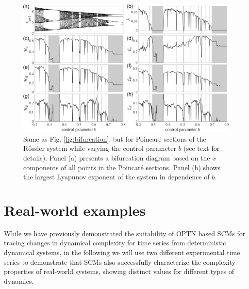 \documentclass[12pt,aip,cha,reprint,nofootinbib]{revtex4-1}
\begin{document}
\begin{figure}
	\centering 
	\includegraphics[width=2\columnwidth]{rosslerEntropy.pdf}
\caption{\small{Same as Fig. \ref{fig:bifurcation}, but for Poincar\'e sections of the R\"ossler system while varying the control parameter $b$ (see text for details). Panel (a) presents a bifurcation diagram based on the $x$ components of all points in the Poincar\'e sections. Panel (b) shows the largest Lyapunov exponent of the system in dependence of $b$.} \label{fig:bifurRossler}}
\end{figure}


\section{Real-world examples} \label{sec:time}

While we have previously demonstrated the suitability of OPTN based SCMs for tracing changes in dynamical complexity for time series from deterministic dynamical systems, in the following we will use two different experimental time series to demonstrate that SCMs also successfully characterize the complexity properties of real-world systems, showing distinct values for different types of dynamics. 
\end{document}
